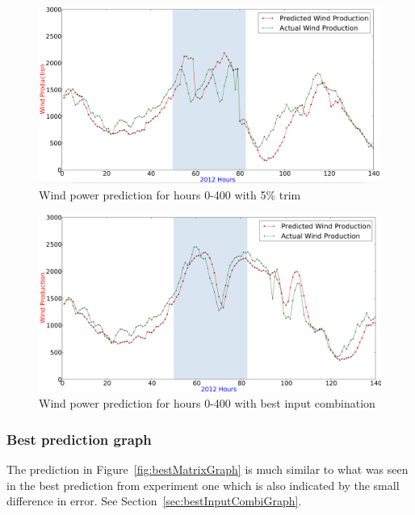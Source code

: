 \begin{figure}[H]
\centering
\includegraphics[width=0.99\linewidth]{billeder/fivePercentTrimPrediction.png}
\caption{Wind power prediction for hours 0-400 with 5\% trim}
\label{fig:fivePercentTrimPrediction}
\end{figure} 

\begin{figure}[H]
\centering
\includegraphics[width=0.99\linewidth]{billeder/bestInputPredictFrom0-400.png}
\caption{Wind power prediction for hours 0-400 with best input combination}
\label{fig:bestInputPredictFrom0-400}
\end{figure} 



\subsubsection{Best prediction graph}
The prediction in Figure~\ref{fig:bestMatrixGraph} is much similar to what was seen in the best prediction from experiment one which is also indicated by the small difference in error. See Section~\ref{sec:bestInputCombiGraph}. 

